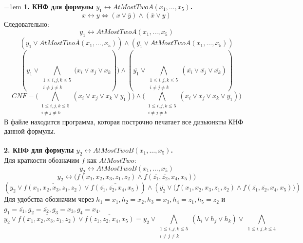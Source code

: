 \documentclass[12pt]{extreport}
\theoremstyle{definiton}
\theoremstyle{definition}
\theoremstyle{definition}
\let\leq\leqslant
\newcommand{\solution}[2][\color{myblue}Решение]{
\medskip
	\noindent{\bfseries #1 }{{\color{myblue}\bfseries #2:}}
}
\newenvironment{blockquote}{%
  \par%
  \medskip
  \leftskip=1em%
  \noindent}{%
  \par\medskip}
\begin{document}
    \solution{2}
    \begin{blockquote}
    {\color{myblue}
    \noindent \textbf{1. КНФ для формулы $y_1 \leftrightarrow AtMostTwoA(x_1, \dots, x_5)$.}\\
    $$x \leftrightarrow y \Leftrightarrow (x \vee \overline{y}) \wedge (\overline{x} \vee y)$$
    Следовательно:\\
    $$y_1 \leftrightarrow AtMostTwoA(x_1, \dots, x_5)$$
    $$(y_1 \vee \overline{AtMostTwoA(x_1, \dots, x_5)}) \wedge (\overline{y_1} \vee AtMostTwoA(x_1, \dots, x_5))$$
    $$(y_1 \vee {\bigwedge\limits_{\substack{1 \leq i, j, k \leq 5 \\
	i \neq j \neq k}} (x_{i} \vee x_{j} \vee x_{k}})) \wedge (\overline{y_1} \vee {\bigwedge\limits_{\substack{1 \leq i, j, k \leq 5 \\
	i \neq j \neq k}} (\overline{x_{i}} \vee \overline{x_{j}} \vee \overline{x_{k}})})$$
	$$CNF = \big({\bigwedge\limits_{\substack{1 \leq i, j, k \leq 5 \\
	i \neq j \neq k}} (x_{i} \vee x_{j} \vee x_{k} \vee y_1)}\big)  \wedge \big({\bigwedge\limits_{\substack{1 \leq i, j, k \leq 5 \\
	i \neq j \neq k}} (\overline{x_{i}} \vee \overline{x_{j}} \vee \overline{x_{k} } \vee \overline{y_1})}\big)$$
	В файле {} находится программа, которая построчно печатает все дизьюнкты КНФ данной формулы.\\
	\\
    \textbf{2. КНФ для формулы $y_2 \leftrightarrow AtMostTwoB(x_1, \dots, x_5)$.}\\
    Для краткости обозначим $f$ как $AtMostTwo$:\\
    $$y_2 \leftrightarrow AtMostTwoB(x_1, \dots, x_5)$$
    $$y_2 \leftrightarrow \big(f(x_1, x_2, x_3, z_1, z_2) \wedge f(\overline{z_1}, \overline{z_2}, x_4, x_5)\big)$$
    $$(y_2 \vee \overline{f(x_1, x_2, x_3, z_1, z_2)} \vee \overline{f(\overline{z_1}, \overline{z_2}, x_4, x_5)}) \wedge (\overline{y_2} \vee \big(f(x_1, x_2, x_3, z_1, z_2) \wedge f(\overline{z_1}, \overline{z_2}, x_4, x_5)\big))$$
    Для удобства обозначим через $h_1 = x_1, h_2 = x_2, h_3 = x_3, h_4 = z_1, h_5 = z_2$ и $g_1 = \overline{z_1}, g_2 = \overline{z_2}, g_3 = x_3, g_4 = x_4$.\\
    $$y_2 \vee \overline{f(x_1, x_2, x_3, z_1, z_2)} \vee \overline{f(\overline{z_1}, \overline{z_2}, x_4, x_5)} = y_2 \vee {\bigwedge\limits_{\substack{1 \leq i, j, k \leq 5 \\
	i \neq j \neq k}} (h_i \vee h_j \vee h_k)} \vee {\bigwedge\limits_{\substack{1 \leq i, j, k \leq 4 \\
}}}$$}
\end{blockquote}
\end{document}
